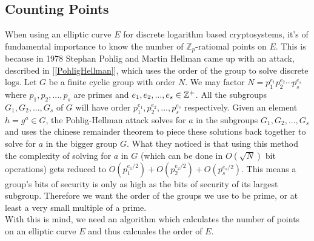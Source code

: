 \subsection{Counting Points}

When using an elliptic curve $E$ for discrete logarithm based cryptosystems, it's of fundamental importance to know the number of $\mathbb{Z}_p$-ratiomal points on $E$. This is because in 1978 Stephan Pohlig and Martin Hellman came up with an attack, described in [\ref{PohligHellman}], which uses the order of the group to solve discrete logs. Let $G$ be a finite cyclic group with order $N$. We may factor $N = p_1^{e_1}p_2^{e_2} \cdots p_s^{e_s}$ where $p_1,p_2,...,p_s$ are primes and $e_1,e_2,...,e_s \in \mathbb{Z}^+ $. All the subgroups $G_1,G_2,...,G_s$ of $G$ will have order $p_1^{e_1},p_2^{e_2},...,p_s^{e_s}$ respectively. Given an element $h = g^a \in G$, the Pohlig-Hellman attack solves for $a$  in the subgroups $G_1,G_2,...,G_s$ and uses the chinese remainder theorem to piece these solutions back together to solve for $a$ in the bigger group $G$. What they noticed is that using this method the complexity of solving for $a$ in $G$ (which can be done in $O(\sqrt{N})$ bit operations) gets reduced to $O(p_1^{e_1/2}) + O(p_2^{e_2/2}) + O(p_s^{e_s/2})$. This means a group's bits of security is only as high as the bits of security of its largest subgroup. Therefore we want the order of the groups we use to be prime, or at least a very small multiple of a prime. \\

With this is mind, we need an algorithm which calculates the number of points on an elliptic curve $E$ and thus calcuales the order of $E$. 



